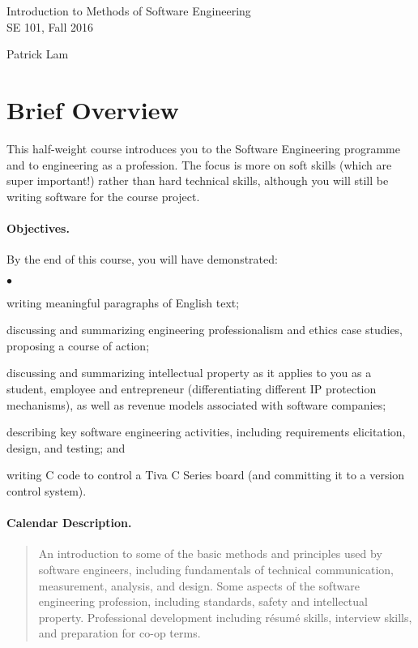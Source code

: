 \documentclass[11pt,onecolumn]{article}
\newcommand{\squishlist}{
 \begin{list}{$\bullet$}
  { \setlength{\itemsep}{0pt}
     \setlength{\parsep}{3pt}
     \setlength{\topsep}{3pt}
     \setlength{\partopsep}{0pt}
     \setlength{\leftmargin}{1.5em}
     \setlength{\labelwidth}{1em}
     \setlength{\labelsep}{0.5em} } }
\newcommand{\squishend}{
  \end{list}  }
\begin{document}
\pagestyle{empty}

\renewcommand{\arraystretch}{0.92}

\begin{center}
\begin{Large}
Introduction to Methods of Software Engineering\\
SE 101, Fall 2016\\[1em]
\end{Large}

\begin{large}
Patrick Lam
\end{large}
\end{center}

\section*{Brief Overview}
This half-weight course introduces you to the Software Engineering programme and to engineering as a profession. The focus is more on soft skills (which are super important!) rather than hard technical skills, although you will still be writing software for the course project.

\paragraph{Objectives.}
By the end of this course, you will have demonstrated:
\squishlist
\item writing meaningful paragraphs of English text;
\item discussing and summarizing engineering professionalism and ethics case studies, proposing a course of action;
\item discussing and summarizing intellectual property as it applies to you as a student, employee and entrepreneur (differentiating different IP protection mechanisms), as well as revenue models associated with software companies; 
\item describing key software engineering activities, including requirements elicitation, design, and testing; and
\item writing C code to control a Tiva C Series board (and committing it to a version control system).
\squishend

\paragraph{Calendar Description.}
\begin{quote}
    An introduction to some of the basic methods and principles used by software engineers, including fundamentals of technical communication, measurement, analysis, and design. Some aspects of the software engineering profession, including standards, safety and intellectual property. Professional development including r\'esum\'e skills, interview skills, and preparation for co-op terms.
\end{quote}
\end{document}
